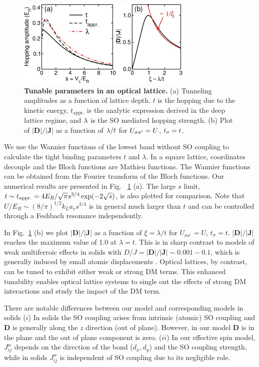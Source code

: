 \documentclass[a4paper,showpacs]{revtex4}
\begin{document}
\begin{figure}[t]
\centering
\includegraphics[width=3.3in]{wannier}
\caption{{\bf\sffamily Tunable parameters in an optical lattice.} (a) Tunneling amplitudes as a function of lattice
depth. $t$ is the hopping due to the kinetic energy, $t_{\text{appr.}}$ is
the analytic expression derived in the deep lattice regime, and $\protect\lambda $
is the SO mediated hopping strength. (b) Plot of $|\mathbf{D}|/|\mathbf{J}| $
as a function of $\protect\lambda /t$ for $U_{\protect\sigma \protect\sigma %
^{\prime }}=U$, $t_{\protect\sigma }=t$.}
\label{fig-wannier}
\end{figure}

We use the Wannier functions of the lowest band without SO coupling to
calculate the tight binding parameters $t$ and $\lambda$. In a square lattice, coordinates decouple and the Bloch
functions are Mathieu functions. The Wannier functions can be obtained from
the Fourier transform of the Bloch functions. Our numerical results are
presented in Fig.~ \ref{fig-wannier} (a). The large $s$ limit, $t\sim t_{%
\text{appr.}}=4E_{R}/\sqrt{\pi }s^{3/4}\exp (-2\sqrt{s})$, is also plotted
for comparison. Note that $U/E_{R}\sim (8/\pi )^{1/2}k_{L}a_{s}s^{3/4}$ is in
general much larger than $t$ and can be controlled through a Feshbach
resonance independently.

In Fig.~\ref{fig-wannier} (b) we plot $|\mathbf{D}|/|\mathbf{J}|$ as a
function of $\xi =\lambda /t$ for $U_{\sigma \sigma ^{\prime }}=U$, $%
t_{\sigma }=t$. $|\mathbf{D}|/|\mathbf{J}|$ reaches the maximum value of 1.0
at $\lambda =t$. This is in sharp contrast to models of weak multiferroic
effects in solids with $D/J = |\mathbf{D}|/|\mathbf{J}| \sim 0.001-0.1$,
which is generally induced by small atomic displacements \cite{Dagotto}.
Optical lattices, by contrast, can be tuned to exhibit either weak or strong
DM terms. This enhanced tunability enables optical lattice systems to single
out the effects of strong DM interactions and study the impact of the DM
term.

There are notable differences between our model and corresponding models in
solids ($i$) In solids the SO coupling arises from intrinsic (atomic) SO
coupling and $\mathbf{D}$ is generally along the $z$ direction (out of
plane). However, in our model $\mathbf{D}$ is in the plane and the out of
plane component is zero. ($ii$) In our effective spin model, $J_{ij}^{\alpha
}$ depends on the direction of the bond ($d_{x},d_{y}$) and the SO coupling
strength, while in solids $J_{ij}^{\alpha }$ is independent of SO coupling
due to its negligible role.
\end{document}
